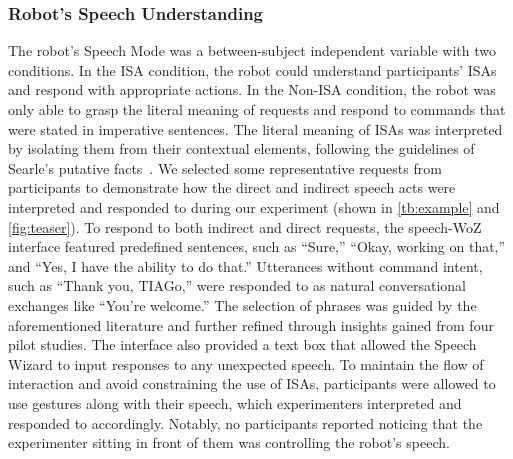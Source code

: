 \subsubsection{Robot's Speech Understanding} \label{speech_model}
The robot's Speech Mode was a between-subject independent variable with two conditions. In the ISA condition, the robot could understand participants' ISAs and respond with appropriate actions. In the Non-ISA condition, the robot was only able to grasp the literal meaning of requests and respond to commands that were stated in imperative sentences. The literal meaning of ISAs was interpreted by isolating them from their contextual elements, following the guidelines of Searle's putative facts~\cite{searle1975indirect}. We selected some representative requests from participants to demonstrate how the direct and indirect speech acts were interpreted and responded to during our experiment (shown in \autoref{tb:example} and \autoref{fig:teaser}). To respond to both indirect and direct requests, the speech-WoZ interface featured predefined sentences, such as ``Sure,'' ``Okay, working on that,'' and ``Yes, I have the ability to do that.'' Utterances without command intent, such as ``Thank you, TIAGo,'' were responded to as natural conversational exchanges like ``You're welcome.'' The selection of phrases was guided by the aforementioned literature and further refined through insights gained from four pilot studies. The interface also provided a text box that allowed the Speech Wizard to input responses to any unexpected speech. To maintain the flow of interaction and avoid constraining the use of ISAs, participants were allowed to use gestures along with their speech, which experimenters interpreted and responded to accordingly. Notably, no participants reported noticing that the experimenter sitting in front of them was controlling the robot's speech.

